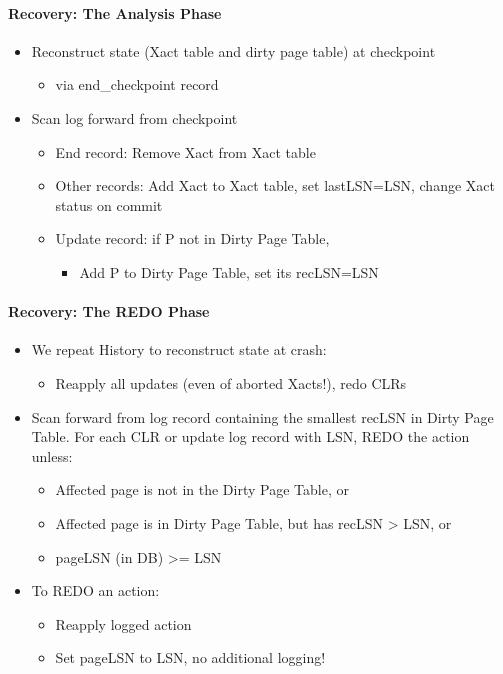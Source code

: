 \paragraph{Recovery: The Analysis Phase}
\begin{itemize}
\item Reconstruct state (Xact table and dirty page table)
  at checkpoint
  \begin{itemize}
  \item via end\_checkpoint record
  \end{itemize}

\item Scan log forward from checkpoint
  \begin{itemize}
  \item End record: Remove Xact from Xact table
  \item Other records: Add Xact to Xact table, set
    lastLSN=LSN, change Xact status on commit
  \item Update record: if P not in Dirty Page Table,
    \begin{itemize}
    \item Add P to Dirty Page Table, set its recLSN=LSN
    \end{itemize}
  \end{itemize}
\end{itemize}


\paragraph{Recovery: The REDO Phase}
\begin{itemize}
\item We repeat History to reconstruct state at crash:
  \begin{itemize}
  \item Reapply all updates (even of aborted Xacts!), redo CLRs
  \end{itemize}

\item Scan forward from log record containing the smallest
  recLSN in Dirty Page Table. For each CLR or update log
  record with LSN, REDO the action unless:
  \begin{itemize}
  \item Affected page is not in the Dirty Page Table, or
  \item Affected page is in Dirty Page Table, but has recLSN > LSN,
    or
  \item pageLSN (in DB) >= LSN
  \end{itemize}

\item To REDO an action:
  \begin{itemize}
  \item Reapply logged action
  \item Set pageLSN to LSN, no additional logging!
  \end{itemize}
\end{itemize}

